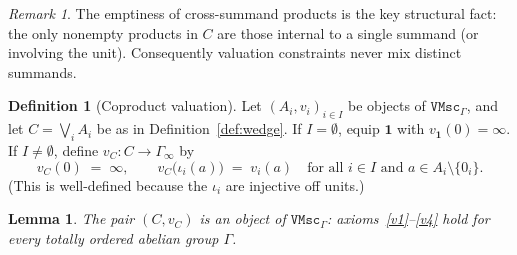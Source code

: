 \documentclass[11pt]{amsart}
\theoremstyle{plain}
\newtheorem{lemma}[theorem]{Lemma}
\theoremstyle{definition}
\newtheorem{definition}[theorem]{Definition}
\theoremstyle{remark}
\newtheorem{remark}[theorem]{Remark}
\newcommand{\VMscG}{\mathtt{VMsc}_{\Gamma}}
\begin{document}
\begin{remark}
\label{rem:cross-empty}
The emptiness of cross-summand products is the key structural fact: the only nonempty products in \(C\) are those internal to a single summand (or involving the unit). Consequently valuation constraints never mix distinct summands.
\end{remark}

\begin{definition}[Coproduct valuation]
\label{def:coprod-val}
Let \((A_i,v_i)_{i\in I}\) be objects of \(\VMscG\), and let \(C=\bigvee_i A_i\) be as in Definition~\ref{def:wedge}. If \(I=\emptyset\), equip \(\mathbf{1}\) with \(v_{\mathbf{1}}(0)=\infty\). If \(I\neq\emptyset\), define \(v_C\colon C\to\Gamma_\infty\) by
\begin{equation}
\label{eq:coprod-val}
v_C(0)\;=\;\infty,
\qquad
v_C\bigl(\iota_i(a)\bigr)\;=\;v_i(a)
\quad\text{for all }i\in I\text{ and }a\in A_i\setminus\{0_i\}.
\end{equation}
(This is well-defined because the \(\iota_i\) are injective off units.)
\end{definition}

\begin{lemma}
\label{lem:coprod-V}
The pair \((C,v_C)\) is an object of \(\VMscG\): axioms~\eqref{v1}--\eqref{v4} hold for every totally ordered abelian group \(\Gamma\).
\end{lemma}
\end{document}
